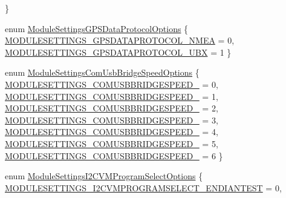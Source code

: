 \begin{DoxyCompactItemize}
 \}
\item 
enum \hyperlink{group___module_settings_ga407fd9d5d5f73f6bd99f41412eeca60e}{\-Module\-Settings\-G\-P\-S\-Data\-Protocol\-Options} \{ \hyperlink{group___module_settings_gga407fd9d5d5f73f6bd99f41412eeca60eae6fa4a923a8d420acce8193d000f209b}{\-M\-O\-D\-U\-L\-E\-S\-E\-T\-T\-I\-N\-G\-S\-\_\-\-G\-P\-S\-D\-A\-T\-A\-P\-R\-O\-T\-O\-C\-O\-L\-\_\-\-N\-M\-E\-A} = 0, 
\hyperlink{group___module_settings_gga407fd9d5d5f73f6bd99f41412eeca60ea45a21d7d3001d52bc4090865eb296eeb}{\-M\-O\-D\-U\-L\-E\-S\-E\-T\-T\-I\-N\-G\-S\-\_\-\-G\-P\-S\-D\-A\-T\-A\-P\-R\-O\-T\-O\-C\-O\-L\-\_\-\-U\-B\-X} = 1
 \}
\item 
enum \hyperlink{group___module_settings_gaaad789c395321805674cd0622a998a29}{\-Module\-Settings\-Com\-Usb\-Bridge\-Speed\-Options} \{ \*
\hyperlink{group___module_settings_ggaaad789c395321805674cd0622a998a29a89397c154df41153e6b9d64c34a11952}{\-M\-O\-D\-U\-L\-E\-S\-E\-T\-T\-I\-N\-G\-S\-\_\-\-C\-O\-M\-U\-S\-B\-B\-R\-I\-D\-G\-E\-S\-P\-E\-E\-D\-\_} = 0, 
\hyperlink{group___module_settings_ggaaad789c395321805674cd0622a998a29afc0800cb9a9893863064aab471e2af50}{\-M\-O\-D\-U\-L\-E\-S\-E\-T\-T\-I\-N\-G\-S\-\_\-\-C\-O\-M\-U\-S\-B\-B\-R\-I\-D\-G\-E\-S\-P\-E\-E\-D\-\_} = 1, 
\hyperlink{group___module_settings_ggaaad789c395321805674cd0622a998a29af107571381c46edf49cc51694be81ffe}{\-M\-O\-D\-U\-L\-E\-S\-E\-T\-T\-I\-N\-G\-S\-\_\-\-C\-O\-M\-U\-S\-B\-B\-R\-I\-D\-G\-E\-S\-P\-E\-E\-D\-\_} = 2, 
\hyperlink{group___module_settings_ggaaad789c395321805674cd0622a998a29a25ab0a8c8d4f59851da85c9d05a786be}{\-M\-O\-D\-U\-L\-E\-S\-E\-T\-T\-I\-N\-G\-S\-\_\-\-C\-O\-M\-U\-S\-B\-B\-R\-I\-D\-G\-E\-S\-P\-E\-E\-D\-\_} = 3, 
\*
\hyperlink{group___module_settings_ggaaad789c395321805674cd0622a998a29a61d12623d3ce88382e67b00746b04f9b}{\-M\-O\-D\-U\-L\-E\-S\-E\-T\-T\-I\-N\-G\-S\-\_\-\-C\-O\-M\-U\-S\-B\-B\-R\-I\-D\-G\-E\-S\-P\-E\-E\-D\-\_} = 4, 
\hyperlink{group___module_settings_ggaaad789c395321805674cd0622a998a29ae1187f35a9e414571cc0e640166d3081}{\-M\-O\-D\-U\-L\-E\-S\-E\-T\-T\-I\-N\-G\-S\-\_\-\-C\-O\-M\-U\-S\-B\-B\-R\-I\-D\-G\-E\-S\-P\-E\-E\-D\-\_} = 5, 
\hyperlink{group___module_settings_ggaaad789c395321805674cd0622a998a29a9419d881859cb10c0d4ac489cc0f88a4}{\-M\-O\-D\-U\-L\-E\-S\-E\-T\-T\-I\-N\-G\-S\-\_\-\-C\-O\-M\-U\-S\-B\-B\-R\-I\-D\-G\-E\-S\-P\-E\-E\-D\-\_} = 6
 \}
\item 
enum \hyperlink{group___module_settings_gaea255ac2a1df1bef69068645a31dbaa5}{\-Module\-Settings\-I2\-C\-V\-M\-Program\-Select\-Options} \{ \*
\hyperlink{group___module_settings_ggaea255ac2a1df1bef69068645a31dbaa5af71b1ab4020153e43e49abd4a91646f5}{\-M\-O\-D\-U\-L\-E\-S\-E\-T\-T\-I\-N\-G\-S\-\_\-\-I2\-C\-V\-M\-P\-R\-O\-G\-R\-A\-M\-S\-E\-L\-E\-C\-T\-\_\-\-E\-N\-D\-I\-A\-N\-T\-E\-S\-T} = 0, 

\end{DoxyCompactItemize}
